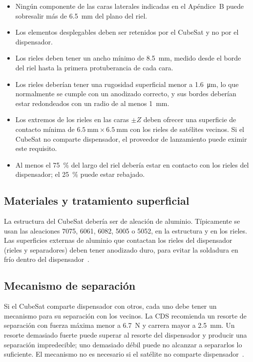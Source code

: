 \begin{itemize}
  \item Ningún componente de las caras laterales indicadas en el Apéndice~B puede sobresalir más de \SI{6,5}{\milli\metre} del plano del riel.
  \item Los elementos desplegables deben ser retenidos por el CubeSat y no por el dispensador.
  \item Los rieles deben tener un ancho mínimo de \SI{8,5}{\milli\metre}, medido desde el borde del riel hasta la primera protuberancia de cada cara.
  \item Los rieles deberían tener una rugosidad superficial menor a \SI{1,6}{\micro\metre}, lo que normalmente se cumple con un anodizado correcto, y sus bordes deberían estar redondeados con un radio de al menos \SI{1}{\milli\metre}.
  \item Los extremos de los rieles en las caras $\pm Z$ deben ofrecer una superficie de contacto mínima de $\SI{6,5}{\milli\metre} \times \SI{6,5}{\milli\metre}$ con los rieles de satélites vecinos. Si el CubeSat no comparte dispensador, el proveedor de lanzamiento puede eximir este requisito.
  \item Al menos el \SI{75}{\percent} del largo del riel debería estar en contacto con los rieles del dispensador; el \SI{25}{\percent} puede estar rebajado.
\end{itemize}

\subsection{Materiales y tratamiento superficial}\label{subsec:cds-materiales}

La estructura del CubeSat debería ser de aleación de aluminio. Típicamente se usan las aleaciones 7075, 6061, 6082, 5005 o 5052, en la estructura y en los rieles. Las superficies externas de aluminio que contactan los rieles del dispensador (rieles y separadores) deben tener anodizado duro, para evitar la soldadura en frío dentro del dispensador~\cite{cds14}.

\subsection{Mecanismo de separación}\label{subsec:cds-separacion}

Si el CubeSat comparte dispensador con otros, cada uno debe tener un mecanismo para su separación con los vecinos. La CDS recomienda un resorte de separación con fuerza máxima menor a \SI{6,7}{\newton} y carrera mayor a \SI{2,5}{\milli\metre}. Un resorte demasiado fuerte puede superar al resorte del dispensador y producir una separación impredecible; uno demasiado débil puede no alcanzar a separarlos lo suficiente. El mecanismo no es necesario si el satélite no comparte dispensador~\cite{cds14}.

